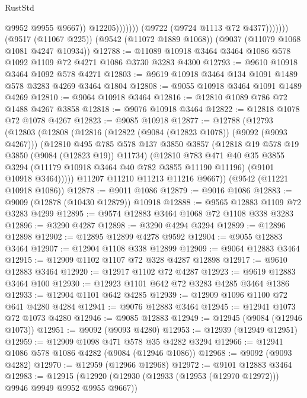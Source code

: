 \begin{lexlean}{RustStd}
\begin{coremodule}
                                @9952
                                @9955
                                @9667))
                            @12205)))))))
              (@9722 (@9724 @1113 @72 @4377)))))))
    (@9517 (@11067 @225))
    (@9542 (@11072 @1889 @1068))
    (@9037 (@11079 @1068 @1081 @4247 @10934))
@12788 := @11089 @10918 @3464 @3464 @1086 @578 @1092 @1109 @72 @4271 @1086 @3730 @3283 @4300
@12793 := @9610 @10918 @3464 @1092 @578 @4271
@12803 := @9619 @10918 @3464 @134 @1091 @1489 @578 @3283 @4269 @3464 @1804
@12808 := @9055 @10918 @3464 @1091 @1489 @4269
@12810 := @9064 @10918 @3464
@12816 := @12810 @1089 @786 @72 @1488 @4267 @3858
@12818 := @9076 @10918 @3464
@12822 := @12818 @1078 @72 @1078 @4267
@12823 := @9085 @10918
@12877 := @12788
    (@12793
      (@12803
        (@12808
          (@12816
            (@12822 (@9084 (@12823 @1078)) (@9092 (@9093 @4267)))
            (@12810
              @495
              @785
              @578
              @137
              @3850
              @3857
              (@12818 @19 @578 @19 @3850 (@9084 (@12823 @19)) @11734)
              (@12810
                @783
                @471
                @40
                @35
                @3855
                @3294
                (@11179 @10918 @3464 @40 @782 @3855 @11190 @11196)
                (@9101 @10918 @3464)))))
        @11207
        @11210
        @11213
        @11216
        @9667))
    (@9542 (@11221 @10918 @1086))
@12878 := @9011 @1086
@12879 := @9016 @1086
@12883 := @9009 (@12878 (@10430 @12879)) @10918
@12888 := @9565 @12883 @1109 @72 @3283 @4299
@12895 := @9574 @12883 @3464 @1068 @72 @1108 @338 @3283
@12896 := @3290 @4287
@12898 := @3290 @4294 @3294
@12899 := @12896 @12898
@12902 := @12895 @12899 @4278 @9592
@12904 := @9055 @12883 @3464
@12907 := @12904 @1108 @338 @12899
@12909 := @9064 @12883 @3464
@12915 := @12909 @1102 @1107 @72 @328 @4287 @12898
@12917 := @9610 @12883 @3464
@12920 := @12917 @1102 @72 @4287
@12923 := @9619 @12883 @3464 @100
@12930 := @12923 @1101 @642 @72 @3283 @4285 @3464 @1386
@12933 := @12904 @1101 @642 @4285
@12939 := @12909 @1096 @1100 @72 @641 @4280 @4284
@12941 := @9076 @12883 @3464
@12945 := @12941 @1073 @72 @1073 @4280
@12946 := @9085 @12883
@12949 := @12945 (@9084 (@12946 @1073))
@12951 := @9092 (@9093 @4280)
@12953 := @12939 (@12949 @12951)
@12959 := @12909 @1098 @471 @578 @35 @4282 @3294
@12966 := @12941 @1086 @578 @1086 @4282 (@9084 (@12946 @1086))
@12968 := @9092 (@9093 @4282)
@12970 := @12959 (@12966 @12968)
@12972 := @9101 @12883 @3464
@12983 := @12915 (@12920 (@12930 (@12933 (@12953 (@12970 @12972))) @9946 @9949 @9952 @9955 @9667))

\end{coremodule}
\end{lexlean}
